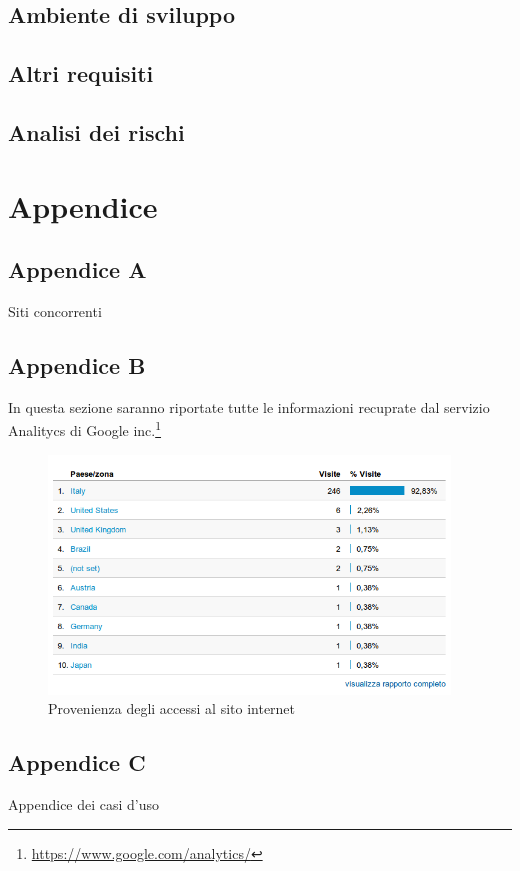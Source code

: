 \documentclass[a4paper,12pt,hidelinks]{report}
\begin{document}
\section{Ambiente di sviluppo}
\section{Altri requisiti}
\section{Analisi dei rischi}

\chapter{Appendice}
\section{Appendice A}
Siti concorrenti
\section{Appendice B}
In questa sezione saranno riportate tutte le informazioni recuprate dal servizio Analitycs di Google inc.\footnote{\url{https://www.google.com/analytics/}}
\begin{figure}[h!]%
	\includegraphics[width=0.95\textwidth,keepaspectratio=true]{img/googleAnalyticsPaesi}
	\centering
	\caption{Provenienza degli accessi al sito internet}%
	\label{fig:googleAnalyticsPaesi}%
\end{figure}
\newpage
\section{Appendice C}
Appendice dei casi d'uso
\end{document}

